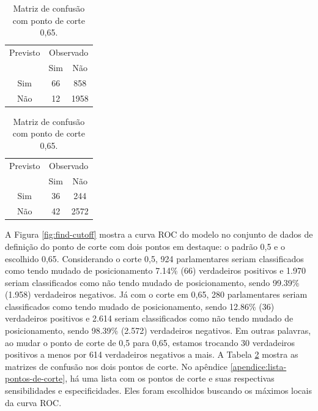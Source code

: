 \documentclass[a4paper,titlepage]{ppgi}\usepackage[]{graphicx}\usepackage[]{color}
\begin{document}
\begin{table}
\caption{Matrizes de confusão do modelo no conjunto de dados de escolha do
ponto de corte.}
\label{table:confusion-matrixes-cutoff-point}
\begin{subtable}{.5\linewidth}
\centering
\caption{Matriz de confusão com ponto de corte 0,5.}
\begin{tabular}{c c c}
    Previsto & \multicolumn{2}{c}{Observado} \\  \cline{2-3}
    & \multicolumn{1}{|c}{Sim} & \multicolumn{1}{c|}{Não} \\
    \hline
    \multicolumn{1}{|c|}{Sim} & 66 & \multicolumn{1}{c|}{ 858 } \\
    \multicolumn{1}{|c|}{Não} & 12 & \multicolumn{1}{c|}{ 1958 } \\
    \hline
    \end{tabular}
\end{subtable}%
\begin{subtable}{.5\linewidth}
\centering
\caption{Matriz de confusão com ponto de corte 0,65.}
\begin{tabular}{c c c}
    Previsto & \multicolumn{2}{c}{Observado} \\  \cline{2-3}
    & \multicolumn{1}{|c}{Sim} & \multicolumn{1}{c|}{Não} \\
    \hline
    \multicolumn{1}{|c|}{Sim} & 36 & \multicolumn{1}{c|}{ 244 } \\
    \multicolumn{1}{|c|}{Não} & 42 & \multicolumn{1}{c|}{ 2572 } \\
    \hline
    \end{tabular}
\end{subtable}
\end{table}



A Figura \ref{fig:find-cutoff} mostra a curva \gls{ROC} do modelo no conjunto
de dados de definição do ponto de corte com dois pontos em destaque: o padrão
0,5 e o escolhido 0,65. Considerando o corte 0,5,
924 parlamentares seriam classificados como tendo mudado de
posicionamento 7.14\%
(66) verdadeiros positivos e 1.970 seriam
classificados como não tendo mudado de posicionamento, sendo
99.39\% (1.958) verdadeiros
negativos. Já com o corte em 0,65, 280
parlamentares seriam classificados como tendo mudado de posicionamento, sendo
12.86\% (36)
verdadeiros positivos e 2.614 seriam classificados como não
tendo mudado de posicionamento, sendo 98.39\% (2.572) verdadeiros negativos. Em outras palavras,
ao mudar o ponto de corte de 0,5 para 0,65, estamos trocando
30 verdadeiros positivos a menos por
614 verdadeiros negativos a mais. A Tabela
\ref{table:confusion-matrixes-cutoff-point} mostra as matrizes de confusão nos
dois pontos de corte. No apêndice \ref{apendice:lista-pontos-de-corte}, há uma
lista com os pontos de corte e suas respectivas sensibilidades e
especificidades. Eles foram escolhidos buscando os máximos locais da curva
\gls{ROC}.
\end{document}
